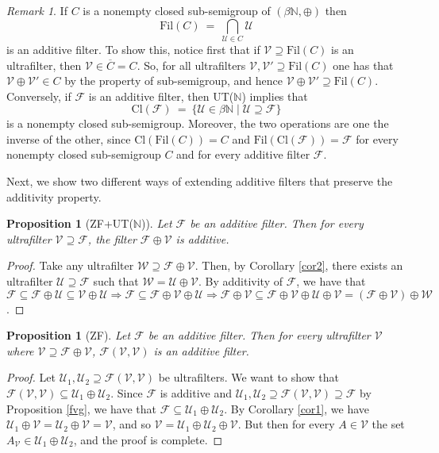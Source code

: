 \documentclass{amsart}
\newtheorem{proposition}[theorem]{Proposition}
\theoremstyle{definition}
\theoremstyle{remark}
\newtheorem{remark}[theorem]{Remark}
\def\F{\mathscr{F}}
\def\U{\mathscr{U}}
\def\V{\mathscr{V}}
\def\W{\mathscr{W}}
\def\N{\mathbb{N}}
\begin{document}
\begin{remark}\label{fil-cl}
If $C$ is a nonempty closed
sub-semigroup of $(\beta\N,\oplus)$ then
$$\text{Fil}(C)\ =\ \bigcap_{\U\in C}\U$$
is an additive filter.
To show this, notice first that if $\V\supseteq\text{Fil}(C)$
is an ultrafilter, then $\V\in \overline{C}=C$. So, for
all ultrafilters $\V,\V'\supseteq\text{Fil}(C)$ one has
that $\V\oplus\V'\in C$ by the property of sub-semigroup,
and hence $\V\oplus\V'\supseteq \text{Fil}(C)$.
Conversely, if $\F$ is an additive filter, then 
\textsf{UT}($\N$) implies that 
$$\text{Cl}(\F)\ =\ \{\U\in\beta\N\mid\U\supseteq\F\}$$
is a nonempty closed sub-semigroup. Moreover, the two operations
are one the inverse of the other, since
$\text{Cl}(\text{Fil}(C))=C$ and
$\text{Fil}(\text{Cl}(\F))=\F$ for every nonempty closed
sub-semigroup $C$ and for every additive filter $\F$.
\end{remark}



Next, we show two different ways of extending additive filters
that preserve the additivity property.

\begin{proposition}[\textsf{ZF+UT}($\N$)]\label{FplusVadditive}
Let $\F$ be an additive filter. Then for every ultrafilter $\V\supseteq\F$,
the filter $\F\oplus\V$ is additive.
\end{proposition}

\begin{proof}
Take any ultrafilter $\W\supseteq\F\oplus\V$. Then, by Corollary \ref{cor2},
there exists an ultrafilter $\U\supseteq\F$
such that $\W=\U\oplus\V$. By additivity of $\F$, we have that
$\F\subseteq\F\oplus\U\subseteq\V\oplus\U\Rightarrow
\F\subseteq\F\oplus\V\oplus\U\Rightarrow
\F\oplus\V\subseteq\F\oplus\V\oplus\U\oplus\V=
(\F\oplus\V)\oplus\W$.
\end{proof}

\begin{proposition}[\textsf{ZF}]\label{fvv}
Let $\F$ be an additive filter. Then for 
every ultrafilter $\V$ where $\V\supseteq\F\oplus\V$, 
$\F(\V,\V)$ is an additive filter.
\end{proposition}

\begin{proof}
Let $\U_1,\U_2\supseteq\F(\V,\V)$ be ultrafilters.
We want to show that $\F(\V,\V)\subseteq\U_1\oplus\U_2$.
Since $\F$ is additive and 
$\U_1,\U_2\supseteq\F(\V,\V)\supseteq\F$ by Proposition \ref{fvg},
we have that $\F\subseteq\U_1\oplus\U_2$. 
By Corollary \ref{cor1}, we have $\U_1\oplus\V=\U_2\oplus\V=\V$,
and so $\V=\U_1\oplus\U_2\oplus\V$.
But then for every $A\in\V$ the set $A_\V\in\U_1\oplus\U_2$,
and the proof is complete.
\end{proof}
\end{document}
